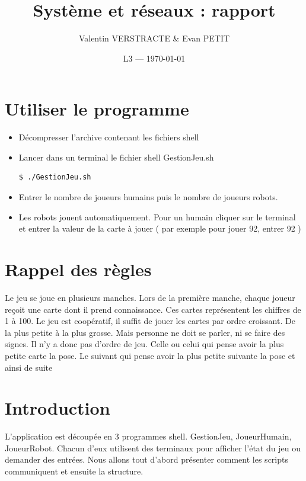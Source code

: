 \documentclass{article}
\title{Système et réseaux : rapport} %
\author{Valentin VERSTRACTE \& Evan PETIT}
\date{L3 --- \today} %
\begin{document}
\maketitle %

\bigskip
\bigskip
\renewcommand{\contentsname}{Table des matières}
\tableofcontents
\newpage

\section*{Utiliser le programme}
%
\begin{itemize}
	\item Décompresser l'archive contenant les fichiers shell
	\item Lancer dans un terminal le fichier shell GestionJeu.sh
	\begin{lstlisting}[language=bash]
 		$ ./GestionJeu.sh
	\end{lstlisting}
	\item Entrer le nombre de joueurs humains puis le nombre de joueurs robots.
	\item Les robots jouent automatiquement. Pour un humain cliquer sur le terminal et entrer la valeur de la carte à jouer ( par exemple pour jouer 92, entrer 92 )
	
\end{itemize}

\section*{Rappel des règles}
%
Le jeu se joue en plusieurs manches. Lors de la première manche,
chaque joueur reçoit une carte dont il prend connaissance. Ces cartes représentent les chiffres de 1 à 100. Le jeu est coopératif, il suffit de jouer les cartes par ordre croissant. De la plus petite à la plus grosse. Mais personne ne doit se parler, ni se faire des signes. Il n’y a donc pas d’ordre de jeu. Celle ou celui qui pense avoir la plus petite carte la pose. Le suivant qui pense avoir la plus petite suivante la pose et ainsi de suite

\section*{Introduction}
%
L'application est découpée en 3 programmes shell. GestionJeu, JoueurHumain, JoueurRobot. Chacun d'eux utilisent des terminaux pour afficher l'état du jeu ou demander des entrées. Nous allons tout d'abord présenter comment les scripts communiquent et ensuite la structure.
\end{document}
